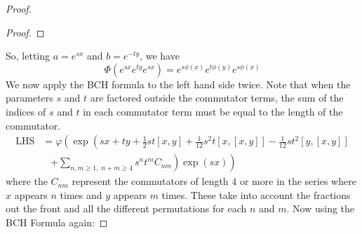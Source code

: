 \documentclass[honours]{UNSWthesis}
\newcommand{\1}{\mathbf{e}_{1}}
\newcommand{\2}{\mathbf{e}_{3}}
\newcommand{\3}{\mathbf{e}_{3}}
\begin{document}
\begin{proof}
\begin{proof}
\end{proof}

So, letting $a=e^{sx}$ and $b=e^{-ty}$, we have 
\[
\Phi(e^{sx}e^{ty}e^{sx})= e^{s\phi(x)}e^{t\phi(y)}e^{s\phi(x)}
\]
We now apply the BCH formula to the left hand side twice. Note that when the parameters $s$ and $t$ are factored outside the commutator terms, the sum of the indices of $s$ and $t$ in each commutator term must be equal to the length of the commutator. 
\begin{align*}
\text{LHS} &= \varphi \left( \exp \left( 
sx+ty+\frac{1}{2}st[x, y]+\frac{1}{12}s^{2}t[x,[x,y]] -\frac{1}{12}st^{2}[y,[x,y]] \right. \right.\\
&\;\;\; \left. \left. +\sum\limits_{n,m \geq 1 ,\; n+m \geq 4} s^{n}t^{m}C_{nm}
\right) \exp (sx) \right) 
\end{align*}
where the $C_{nm}$ represent the commutators of length $4$ or more in the series where $x$ appears $n$ times and $y$ appears $m$ times. These take into account the fractions out the front and all the different permutations for each $n$ and $m$. Now using the BCH Formula again:


\end{proof}
\end{document}

